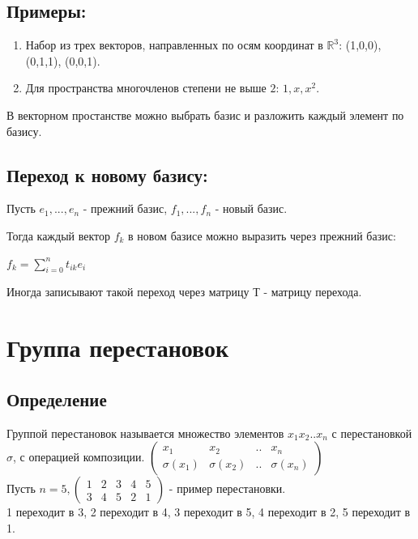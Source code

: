 \documentclass[12pt]{article}
\begin{document}
    \subsection{Примеры:}

    \begin{enumerate}
        \item Набор из трех векторов, направленных по осям координат в $\mathbb{R}^{3}$:
              (1,0,0), (0,1,1), (0,0,1).

        \item Для пространства многочленов степени не выше $2$: $1, x, x^{2}$.
    \end{enumerate}


    В векторном простанстве можно выбрать базис и разложить каждый элемент по базису.

    \subsection{Переход к новому базису:}

    Пусть $e_{1},...,e_{n}$ - прежний базис, $f_{1},...,f_{n}$ - новый базис.

    Тогда каждый вектор $f_{k}$ в новом базисе можно выразить через прежний базис:

$f_{k} = \sum\limits_{i=0}^n t_{ik}e_{i}$

    Иногда записывают такой переход через матрицу Т - матрицу перехода.

    \section{Группа перестановок}
    \subsection{Определение}
    Группой перестановок называется множество элементов ${x_1 x_2  ..  x_n}$ с перестановкой $\sigma$, с операцией композиции.
$\begin{pmatrix}
    x_1         & x_2         & .. & x_n         \\
    \sigma(x_1) & \sigma(x_2) & .. & \sigma(x_n)
\end{pmatrix}$\\
    Пусть $n=5,
\begin{pmatrix}
    1 & 2 & 3 & 4 & 5 \\
    3 & 4 & 5 & 2 & 1
\end{pmatrix}$ - пример перестановки.\\
    1 переходит в 3, 2 переходит в 4, 3 переходит в 5, 4 переходит в 2, 5 переходит в 1.\\
\end{document}
